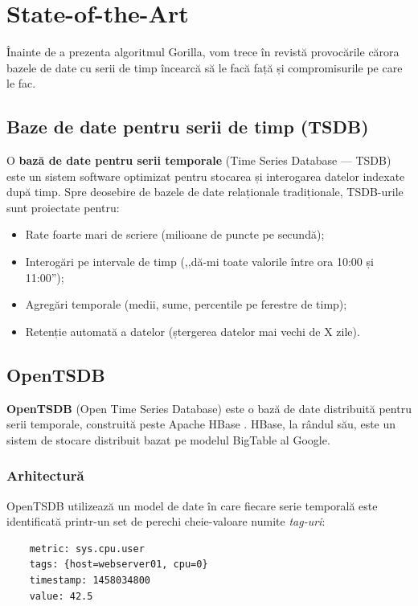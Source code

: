 \chapter{State-of-the-Art}

Înainte de a prezenta algoritmul Gorilla, vom trece în revistă provocările cărora bazele de date cu serii de timp încearcă să le facă față și compromisurile pe care le fac.

\section{Baze de date pentru serii de timp (TSDB)}

O \textbf{bază de date pentru serii temporale} (Time Series Database --- TSDB) este un sistem software optimizat pentru stocarea și interogarea datelor indexate după timp. Spre deosebire de bazele de date relaționale tradiționale, TSDB-urile sunt proiectate pentru:

\begin{itemize}
    \item Rate foarte mari de scriere (milioane de puncte pe secundă);
    \item Interogări pe intervale de timp (,,dă-mi toate valorile între ora 10:00 și 11:00'');
    \item Agregări temporale (medii, sume, percentile pe ferestre de timp);
    \item Retenție automată a datelor (ștergerea datelor mai vechi de X zile).
\end{itemize}

\section{OpenTSDB}

\textbf{OpenTSDB} (Open Time Series Database) este o bază de date distribuită pentru serii temporale, construită peste Apache HBase \cite{opentsdb}. HBase, la rândul său, este un sistem de stocare distribuit bazat pe modelul BigTable al Google.

\subsection{Arhitectură}

OpenTSDB utilizează un model de date în care fiecare serie temporală este identificată printr-un set de perechi cheie-valoare numite \textit{tag-uri}:

\begin{verbatim}
    metric: sys.cpu.user
    tags: {host=webserver01, cpu=0}
    timestamp: 1458034800
    value: 42.5
\end{verbatim}

